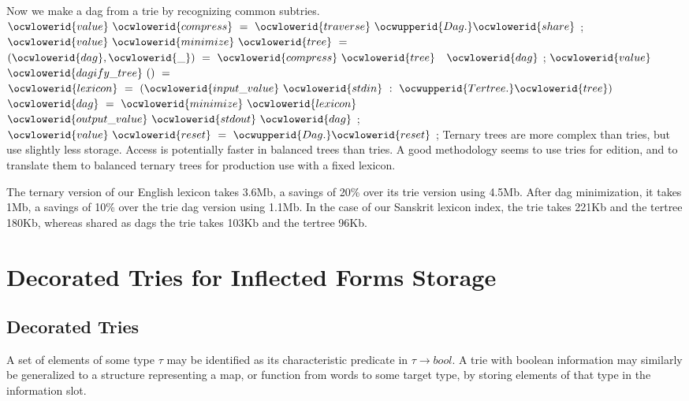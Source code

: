 \documentclass[12pt]{article}
\begin{document}
\ocwendcode{}\ocwindent{0.00em}
Now we make a dag from a trie by recognizing common subtries. 
\ocweol
\label{../ML/minitertree.ml:1973}%
\medskip
\ocwbegincode{}\ocwindent{0.00em}
$\ocwlowerid{value}~\ocwlowerid{compress}~=~\ocwlowerid{traverse}~\ocwupperid{Dag.}\ocwlowerid{share}$\ocweol
\ocwindent{0.00em}
;\ocweol
\ocwindent{0.00em}
$\ocwlowerid{value}~\ocwlowerid{minimize}~\ocwlowerid{tree}~=~$~$(\ocwlowerid{dag},\ocwlowerid{\_})~=~\ocwlowerid{compress}~\ocwlowerid{tree}~$~$\ocwlowerid{dag}$\ocweol
\ocwindent{0.00em}
;\ocweol
\ocwindent{0.00em}
$\ocwlowerid{value}~$~$\ocwlowerid{dagify\_tree}~()~=$\ocweol
\ocwindent{1.00em}
~$\ocwlowerid{lexicon}~=~(\ocwlowerid{input\_value}~\ocwlowerid{stdin}~:~\ocwupperid{Tertree.}\ocwlowerid{tree})~$\ocweol
\ocwindent{1.00em}
~$\ocwlowerid{dag}~=~\ocwlowerid{minimize}~\ocwlowerid{lexicon}~$~\ocweol
\ocwindent{1.00em}
$\ocwlowerid{output\_value}~\ocwlowerid{stdout}~\ocwlowerid{dag}$\ocweol
\ocwindent{0.00em}
;\ocweol
\ocwindent{0.00em}
$\ocwlowerid{value}~\ocwlowerid{reset}~=~\ocwupperid{Dag.}\ocwlowerid{reset}$\ocweol
\ocwindent{0.00em}
;\ocweol
\ocwendcode{}\vspace*{15pt}
Ternary trees are more complex than tries, but use slightly less storage.
Access is potentially faster in balanced trees than tries. 
A good methodology seems to use tries for edition, and to translate them
to balanced ternary trees for production use with a fixed lexicon.

The ternary version of our English lexicon takes 3.6Mb, a savings of 20\%
over its trie version using 4.5Mb. After dag minimization, it takes 1Mb,
a savings of 10\% over the trie dag version using 1.1Mb. 
In the case of our Sanskrit lexicon index, the trie takes 221Kb and the tertree
180Kb, whereas shared as dags the trie takes 103Kb and the tertree 96Kb.

\section{Decorated Tries for Inflected Forms Storage}

\subsection{Decorated Tries}

A set of elements of some type $\tau$ may be identified as its
characteristic predicate in $\tau\rightarrow bool$. A trie with boolean 
information may similarly be generalized to a structure
representing a map, or function from words to some target type, by storing
elements of that type in the information slot. 
\end{document}
